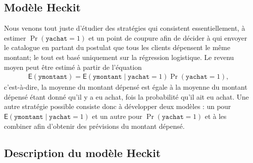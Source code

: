 \documentclass[
  11pt,
  letterpaper,
]{book}
\theoremstyle{definition}
\theoremstyle{remark}
\begin{document}
\hypertarget{moduxe8le-heckit}{%
\subsection{Modèle Heckit}\label{moduxe8le-heckit}}

Nous venons tout juste d'étudier des stratégies qui consistent
essentiellement, à estimer \(\Pr(\texttt{yachat}=1)\) et un point de
coupure afin de décider à qui envoyer le catalogue en partant du
postulat que tous les clients dépensent le même montant; le tout est
basé uniquement sur la régression logistique. Le revenu moyen peut être
estimé à partir de l'équation \begin{align*}
\mathsf{E}(\texttt{ymontant}) = \mathsf{E}(\texttt{ymontant} \mid \texttt{yachat}=1) \Pr(\texttt{yachat
}=1),
\end{align*} c'est-à-dire, la moyenne du montant dépensé est égale à la
moyenne du montant dépensé étant donné qu'il y a eu achat, fois la
probabilité qu'il ait eu achat. Une autre stratégie possible consiste
donc à développer deux modèles : un pour
\(\mathsf{E}(\texttt{ymontant} \mid \texttt{yachat}=1)\) et un autre
pour \(\Pr(\texttt{yachat}=1)\) et à les combiner afin d'obtenir des
prévisions du montant dépensé.

\hypertarget{description-du-moduxe8le-heckit}{%
\subsection*{Description du modèle
Heckit}\label{description-du-moduxe8le-heckit}}
\end{document}
